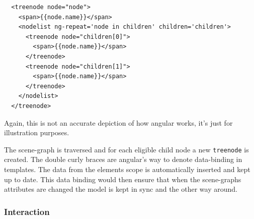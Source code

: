 \begin{verbatim}
  <treenode node="node">
    <span>{{node.name}}</span>
    <nodelist ng-repeat='node in children' children='children'>
      <treenode node="children[0]">
        <span>{{node.name}}</span>
      </treenode>
      <treenode node="children[1]">
        <span>{{node.name}}</span>
      </treenode>
    </nodelist>
  </treenode>
\end{verbatim}

Again, this is not an accurate depiction of how angular works, it's just
for illustration purposes.

The scene-graph is traversed and for each eligible child node a new
\texttt{treenode} is created. The double curly braces are angular's way
to denote data-binding in templates. The data from the elements scope is
automatically inserted and kept up to date. This data binding would then
ensure that when the scene-graphs attributes are changed the model is
kept in sync and the other way around.

\subsubsection{Interaction}\label{interaction}
